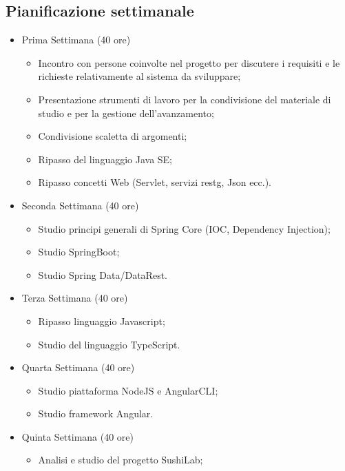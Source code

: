 \subsection*{Pianificazione settimanale}
\begin{itemize}
    \item Prima Settimana (40 ore)
    \begin{itemize}
        \item Incontro con persone coinvolte nel progetto per discutere i requisiti e le richieste relativamente
        al sistema da sviluppare;
        \item Presentazione strumenti di lavoro per la condivisione del materiale di studio e per la gestione
        dell'avanzamento;
        \item Condivisione scaletta di argomenti;
        \item Ripasso del linguaggio Java SE;
        \item Ripasso concetti Web (Servlet, servizi \gls{restg}, Json ecc.).
    \end{itemize}
    \item Seconda Settimana (40 ore)
        \begin{itemize}
            \item Studio principi generali di Spring Core (IOC, Dependency Injection);
            \item Studio SpringBoot;
            \item Studio Spring Data/DataRest.
        \end{itemize}
    \item Terza Settimana (40 ore)
        \begin{itemize}
            \item Ripasso linguaggio Javascript;
            \item Studio del linguaggio TypeScript.
        \end{itemize}
    \item Quarta Settimana (40 ore)
        \begin{itemize}
            \item Studio piattaforma NodeJS e AngularCLI;
            \item Studio framework Angular.
        \end{itemize}
    \item Quinta Settimana (40 ore)
        \begin{itemize}
        \item Analisi e studio del progetto SushiLab;

\end{itemize}
\end{itemize}
